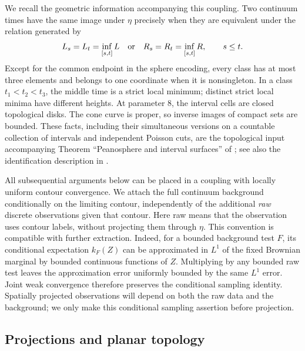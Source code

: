 We recall the geometric information accompanying this coupling.  Two
continuum times have the same image under $\eta$ precisely when they
are equivalent under the relation generated by
\begin{equation}\label{inp:brownian-fibers}
 L_s=L_t=\inf_{[s,t]}L
 \quad\hbox{or}\quad
 R_s=R_t=\inf_{[s,t]}R,\qquad s\le t.
\end{equation}
Except for the common endpoint in the sphere encoding, every class has
at most three elements and belongs to one coordinate when it is
nonsingleton.  In a class $t_1<t_2<t_3$, the middle time is a strict
local minimum; distinct strict local minima have different heights.
At parameter $8$, the interval cells are closed topological disks.
The cone curve is proper, so inverse images of compact sets are bounded.
These facts, including their simultaneous versions on a countable
collection of intervals and independent Poisson cuts, are the
topological input accompanying Theorem ``Peanosphere and interval surfaces'' of
\cite{MetricMaps}; see also the identification description in
\cite[Section~1.3.1 and Lemma~8.15]{DMS}.

All subsequential arguments below can be placed in a coupling with
locally uniform contour convergence.  We attach the full continuum
background conditionally on the limiting contour, independently of
the additional \emph{raw} discrete observations given that contour.
Here raw means that the observation uses contour labels, without
projecting them through $\eta$.  This convention is compatible with
further extraction.  Indeed, for a bounded background test $F$, its
conditional expectation $k_F(Z)$ can be approximated in $L^1$ of the
fixed Brownian marginal by bounded continuous functions of $Z$.
Multiplying by any bounded raw test leaves the approximation error
uniformly bounded by the same $L^1$ error.  Joint weak convergence
therefore preserves the conditional sampling identity.  Spatially
projected observations will depend on both the raw data and the
background; we only make this conditional sampling assertion before
projection.

\subsection{Projections and planar topology}

